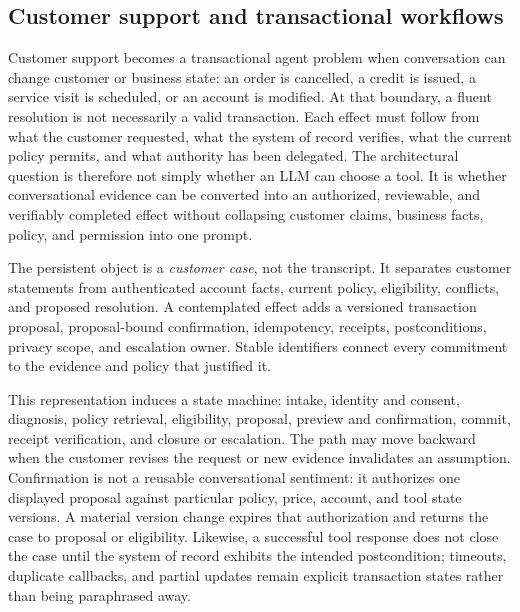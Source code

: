 \subsection{Customer support and transactional workflows}

Customer support becomes a transactional agent problem when conversation can change customer or business state: an order is cancelled, a credit is issued, a service visit is scheduled, or an account is modified. At that boundary, a fluent resolution is not necessarily a valid transaction. Each effect must follow from what the customer requested, what the system of record verifies, what the current policy permits, and what authority has been delegated. The architectural question is therefore not simply whether an LLM can choose a tool. It is whether conversational evidence can be converted into an authorized, reviewable, and verifiably completed effect without collapsing customer claims, business facts, policy, and permission into one prompt.

The persistent object is a \emph{customer case}, not the transcript. It separates customer statements from authenticated account facts, current policy, eligibility, conflicts, and proposed resolution. A contemplated effect adds a versioned transaction proposal, proposal-bound confirmation, idempotency, receipts, postconditions, privacy scope, and escalation owner. Stable identifiers connect every commitment to the evidence and policy that justified it.

This representation induces a state machine: intake, identity and consent, diagnosis, policy retrieval, eligibility, proposal, preview and confirmation, commit, receipt verification, and closure or escalation. The path may move backward when the customer revises the request or new evidence invalidates an assumption. Confirmation is not a reusable conversational sentiment: it authorizes one displayed proposal against particular policy, price, account, and tool state versions. A material version change expires that authorization and returns the case to proposal or eligibility. Likewise, a successful tool response does not close the case until the system of record exhibits the intended postcondition; timeouts, duplicate callbacks, and partial updates remain explicit transaction states rather than being paraphrased away.

